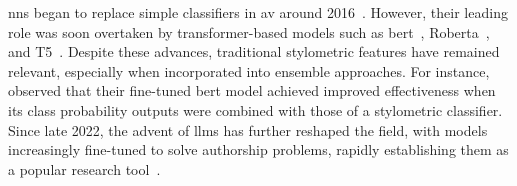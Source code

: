 \acp{nn} began to replace simple classifiers in \ac{av} around 2016~\citep{schmidt_llm_av_latin_24}. 
However, their leading role was soon overtaken by transformer-based models such as \acs{bert}~\citep{bert_2019}, Ro\acs{bert}a~\citep{roberta_2019}, and T5~\citep{t5_2020}. 
Despite these advances, traditional stylometric features have remained relevant, especially when incorporated into ensemble approaches. 
For instance, \citet{bertaa_2020} observed that their fine-tuned \acs{bert} model achieved improved effectiveness when its class probability outputs were combined with those of a stylometric classifier.
Since late 2022, the advent of \acp{llm} has further reshaped the field, with models increasingly fine-tuned to solve authorship problems, rapidly establishing them as a popular research tool~\citep{schmidt_llm_av_latin_24}.
